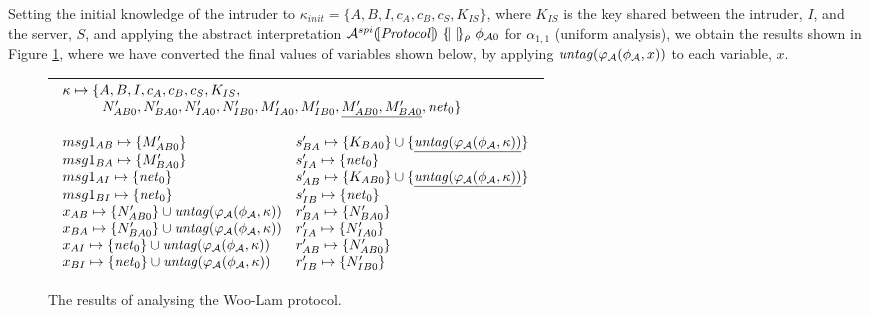 \documentclass[10pt,a4paper,final,oneside,fleqn]{book}
\begin{document}
Setting the initial knowledge of the intruder to $\kappa_{init}=\{A,B,I,c_A,c_B,c_S,K_{IS}\}$, where $K_{IS}$ is the key shared between the intruder, $I$, and the server, $S$, and applying the abstract interpretation $\mathcal{A}^{spi}(\![\mbox{{\itshape Protocol\/}}]\!)~\{\!|~|\!\}_\rho~\phi_{\mathcal{A}0}$ for $\alpha_{1,1}$ (uniform analysis), we obtain the results shown in Figure \ref{anwoo}, where we have converted the final values of variables shown below, by applying $\mbox{{\itshape untag\/}}(\varphi_\mathcal{A}(\phi_\mathcal{A},x))$ to each variable, $x$.
\begin{figure}[bht]
\begin{center}
\begin{tabular}{|l|}
\hline
$\begin{array}{ll}
\multicolumn{2}{l}{\kappa\mapsto\{A,B,I,c_A,c_B,c_S,K_{IS},}\\
\multicolumn{2}{l}{\hspace{10mm} N'_{AB0},N'_{BA0},N'_{IA0},N'_{IB0},M'_{IA0},M'_{IB0},\underline{M'_{AB0},M'_{BA0}},\mbox{{\itshape net\/}}_0\}}\\\\
msg1_{AB}\mapsto\{M'_{AB0}\}&s'_{BA}\mapsto\{K_{BA0}\}\cup\{\underline{\mbox{{\itshape untag\/}}(\varphi_\mathcal{A}(\phi_\mathcal{A},\kappa))}\}\\
msg1_{BA}\mapsto\{M'_{BA0}\}&s'_{IA}\mapsto\{\mbox{{\itshape net\/}}_0\}\\
msg1_{AI}\mapsto\{\mbox{{\itshape net\/}}_0\}&s'_{AB}\mapsto\{K_{AB0}\}\cup\{\underline{\mbox{{\itshape untag\/}}(\varphi_\mathcal{A}(\phi_\mathcal{A},\kappa))}\}\\
msg1_{BI}\mapsto\{\mbox{{\itshape net\/}}_0\}&s'_{IB}\mapsto\{\mbox{{\itshape net\/}}_0\}\\
x_{AB}\mapsto\{N'_{AB0}\}\cup\mbox{{\itshape untag\/}}(\varphi_\mathcal{A}(\phi_\mathcal{A},\kappa))&r'_{BA}\mapsto\{N'_{BA0}\}\\
x_{BA}\mapsto\{N'_{BA0}\}\cup\mbox{{\itshape untag\/}}(\varphi_\mathcal{A}(\phi_\mathcal{A},\kappa))&r'_{IA}\mapsto\{N'_{IA0}\}\\
x_{AI}\mapsto\{\mbox{{\itshape net\/}}_0\}\cup\mbox{{\itshape untag\/}}(\varphi_\mathcal{A}(\phi_\mathcal{A},\kappa))&r'_{AB}\mapsto\{N'_{AB0}\}\\
x_{BI}\mapsto\{\mbox{{\itshape net\/}}_0\}\cup\mbox{{\itshape untag\/}}(\varphi_\mathcal{A}(\phi_\mathcal{A},\kappa))&r'_{IB}\mapsto\{N'_{IB0}\}\\
\end{array}$\\
\hline
\end{tabular}
\end{center}
\caption{The results of analysing the Woo-Lam protocol.\label{anwoo}}
\end{figure}
\end{document}
